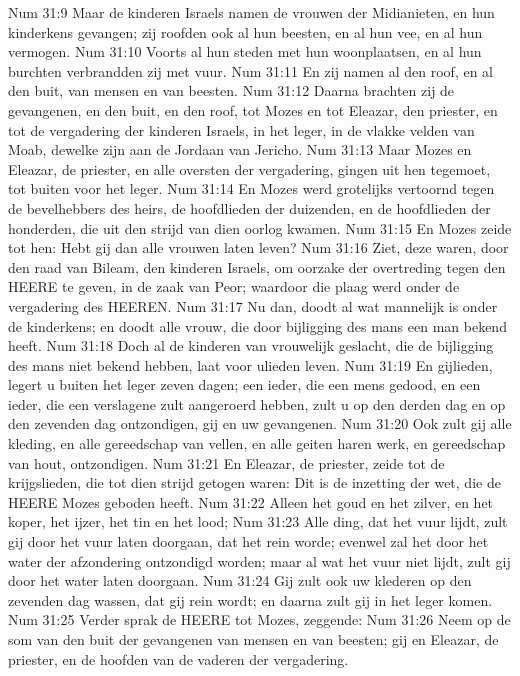 Num 31:9  Maar de kinderen Israels namen de vrouwen der Midianieten, en hun kinderkens gevangen; zij roofden ook al hun beesten, en al hun vee, en al hun vermogen.
Num 31:10  Voorts al hun steden met hun woonplaatsen, en al hun burchten verbrandden zij met vuur.
Num 31:11  En zij namen al den roof, en al den buit, van mensen en van beesten.
Num 31:12  Daarna brachten zij de gevangenen, en den buit, en den roof, tot Mozes en tot Eleazar, den priester, en tot de vergadering der kinderen Israels, in het leger, in de vlakke velden van Moab, dewelke zijn aan de Jordaan van Jericho.
Num 31:13  Maar Mozes en Eleazar, de priester, en alle oversten der vergadering, gingen uit hen tegemoet, tot buiten voor het leger.
Num 31:14  En Mozes werd grotelijks vertoornd tegen de bevelhebbers des heirs, de hoofdlieden der duizenden, en de hoofdlieden der honderden, die uit den strijd van dien oorlog kwamen.
Num 31:15  En Mozes zeide tot hen: Hebt gij dan alle vrouwen laten leven?
Num 31:16  Ziet, deze waren, door den raad van Bileam, den kinderen Israels, om oorzake der overtreding tegen den HEERE te geven, in de zaak van Peor; waardoor die plaag werd onder de vergadering des HEEREN.
Num 31:17  Nu dan, doodt al wat mannelijk is onder de kinderkens; en doodt alle vrouw, die door bijligging des mans een man bekend heeft.
Num 31:18  Doch al de kinderen van vrouwelijk geslacht, die de bijligging des mans niet bekend hebben, laat voor ulieden leven.
Num 31:19  En gijlieden, legert u buiten het leger zeven dagen; een ieder, die een mens gedood, en een ieder, die een verslagene zult aangeroerd hebben, zult u op den derden dag en op den zevenden dag ontzondigen, gij en uw gevangenen.
Num 31:20  Ook zult gij alle kleding, en alle gereedschap van vellen, en alle geiten haren werk, en gereedschap van hout, ontzondigen.
Num 31:21  En Eleazar, de priester, zeide tot de krijgslieden, die tot dien strijd getogen waren: Dit is de inzetting der wet, die de HEERE Mozes geboden heeft.
Num 31:22  Alleen het goud en het zilver, en het koper, het ijzer, het tin en het lood;
Num 31:23  Alle ding, dat het vuur lijdt, zult gij door het vuur laten doorgaan, dat het rein worde; evenwel zal het door het water der afzondering ontzondigd worden; maar al wat het vuur niet lijdt, zult gij door het water laten doorgaan.
Num 31:24  Gij zult ook uw klederen op den zevenden dag wassen, dat gij rein wordt; en daarna zult gij in het leger komen.
Num 31:25  Verder sprak de HEERE tot Mozes, zeggende:
Num 31:26  Neem op de som van den buit der gevangenen van mensen en van beesten; gij en Eleazar, de priester, en de hoofden van de vaderen der vergadering.
